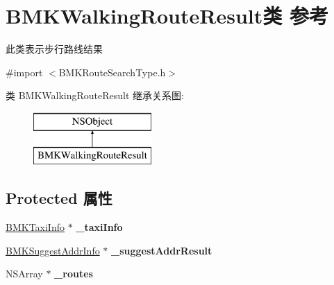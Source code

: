\hypertarget{interface_b_m_k_walking_route_result}{}\section{B\+M\+K\+Walking\+Route\+Result类 参考}
\label{interface_b_m_k_walking_route_result}


此类表示步行路线结果  




{\ttfamily \#import $<$B\+M\+K\+Route\+Search\+Type.\+h$>$}

类 B\+M\+K\+Walking\+Route\+Result 继承关系图\+:\begin{figure}[H]
\begin{center}
\leavevmode
\includegraphics[height=2.000000cm]{interface_b_m_k_walking_route_result}
\end{center}
\end{figure}
\subsection*{Protected 属性}
\begin{DoxyCompactItemize}
\item 
\hypertarget{interface_b_m_k_walking_route_result_a06266f058bb82711e6bb63f4d1837d95}{}\hyperlink{interface_b_m_k_taxi_info}{B\+M\+K\+Taxi\+Info} $\ast$ {\bfseries \+\_\+taxi\+Info}\label{interface_b_m_k_walking_route_result_a06266f058bb82711e6bb63f4d1837d95}

\item 
\hypertarget{interface_b_m_k_walking_route_result_ae300b05f1e799eb3d91985e88170a601}{}\hyperlink{interface_b_m_k_suggest_addr_info}{B\+M\+K\+Suggest\+Addr\+Info} $\ast$ {\bfseries \+\_\+suggest\+Addr\+Result}\label{interface_b_m_k_walking_route_result_ae300b05f1e799eb3d91985e88170a601}

\item 
\hypertarget{interface_b_m_k_walking_route_result_a9f52e1604f500f2de097f3f8d1800b45}{}N\+S\+Array $\ast$ {\bfseries \+\_\+routes}\label{interface_b_m_k_walking_route_result_a9f52e1604f500f2de097f3f8d1800b45}

\end{DoxyCompactItemize}
